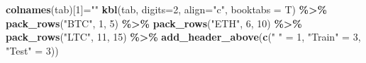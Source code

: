 \documentclass[
]{article}
\newenvironment{Shaded}{\begin{snugshade}}{\end{snugshade}}
\newcommand{\AttributeTok}[1]{\textcolor[rgb]{0.13,0.29,0.53}{#1}}
\newcommand{\DecValTok}[1]{\textcolor[rgb]{0.00,0.00,0.81}{#1}}
\newcommand{\FunctionTok}[1]{\textcolor[rgb]{0.13,0.29,0.53}{\textbf{#1}}}
\newcommand{\NormalTok}[1]{#1}
\newcommand{\OtherTok}[1]{\textcolor[rgb]{0.56,0.35,0.01}{#1}}
\newcommand{\SpecialCharTok}[1]{\textcolor[rgb]{0.81,0.36,0.00}{\textbf{#1}}}
\newcommand{\StringTok}[1]{\textcolor[rgb]{0.31,0.60,0.02}{#1}}
\begin{document}
\begin{Shaded}
\begin{Highlighting}[]
\FunctionTok{colnames}\NormalTok{(tab)[}\DecValTok{1}\NormalTok{]}\OtherTok{=}\StringTok{""}
\FunctionTok{kbl}\NormalTok{(tab, }\AttributeTok{digits=}\DecValTok{2}\NormalTok{, }\AttributeTok{align=}\StringTok{"c"}\NormalTok{, }\AttributeTok{booktabs =}\NormalTok{ T) }\SpecialCharTok{\%\textgreater{}\%}
  \FunctionTok{pack\_rows}\NormalTok{(}\StringTok{"BTC"}\NormalTok{, }\DecValTok{1}\NormalTok{, }\DecValTok{5}\NormalTok{) }\SpecialCharTok{\%\textgreater{}\%}
  \FunctionTok{pack\_rows}\NormalTok{(}\StringTok{"ETH"}\NormalTok{, }\DecValTok{6}\NormalTok{, }\DecValTok{10}\NormalTok{) }\SpecialCharTok{\%\textgreater{}\%}
  \FunctionTok{pack\_rows}\NormalTok{(}\StringTok{"LTC"}\NormalTok{, }\DecValTok{11}\NormalTok{, }\DecValTok{15}\NormalTok{) }\SpecialCharTok{\%\textgreater{}\%}
  \FunctionTok{add\_header\_above}\NormalTok{(}\FunctionTok{c}\NormalTok{(}\StringTok{" "} \OtherTok{=} \DecValTok{1}\NormalTok{, }\StringTok{"Train"} \OtherTok{=} \DecValTok{3}\NormalTok{, }\StringTok{"Test"} \OtherTok{=} \DecValTok{3}\NormalTok{))}
\end{Highlighting}
\end{Shaded}
\end{document}
